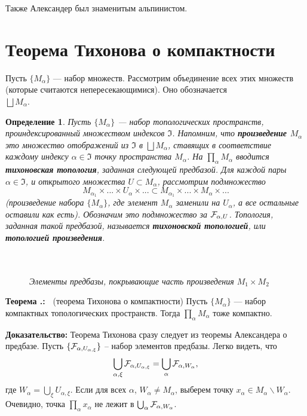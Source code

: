 \documentclass[12pt]{book}
\theoremstyle{upshape}
\theoremstyle{generic}
\newtheorem{opredelenie}[teorema]{Определение}
\def\еза{\end{remark}}
\theoremstyle{upshapenonumber}
\newcommand{\следствие}{%
     \refstepcounter{teorema}
     {\noindent\bf Следствие \thechapter.\arabic{teorema}:\ }}
\newcommand{\пример}{%
     \refstepcounter{teorema}
     {\noindent\bf Пример \thechapter.\arabic{teorema}:\ }}
\newcommand{\лемма}{%
     \refstepcounter{teorema}
     {\noindent\bf Лемма \thechapter.\arabic{teorema}:\ }}
\newcommand{\теорема}{%
     \refstepcounter{teorema}
     {\noindent\bf Теорема \thechapter.\arabic{teorema}:\ }}
\newcommand{\утверждение}{%
     \refstepcounter{teorema}
     {\noindent\bf Утверждение \thechapter.\arabic{teorema}:\ }}
\def\ноиндент{\noindent}
\def\бф{\bf}
\def\ем{\em}
\def\ез{\end{zadacha}}
\def\еу{\end{ukazanie}}
\def\определение{\begin{opredelenie}}
\def\ео{\end{opredelenie}}
\def\goth{\mathfrak}
\def\енум{\begin{enumerate}}
\def\ее{\end{enumerate}}
\begin{document}
Также Александер был знаменитым альпинистом.


\section{Теорема Тихонова о компактности}


Пусть $\{M_\alpha\}$ --- набор множеств.
Рассмотрим объединение всех этих множеств
(которые считаются непересекающимися).
Оно обозначается \\ $\bigsqcup M_\alpha$.


\определение
Пусть $\{M_\alpha\}$ --- набор топологических пространств, 
проиндексированный множеством индексов ${\goth I}$. 
Напомним, что {\бф произведение $M_\alpha$} 
это множество отображений из ${\goth I}$ в $\bigsqcup
M_\alpha$, ставящих в соответствие каждому индексу
$\alpha \in {\goth I}$ точку пространства $M_\alpha$.
На $\prod_\alpha M_\alpha$ вводится {\бф тихоновская топология},
заданная следующей предбазой. Для каждой пары
$\alpha \in {\goth I}$, и открытого множества
$U \subset M_\alpha$, рассмотрим
подмножество 
\[
M_{\alpha_1} \times ... \times U_\alpha \times ... \subset 
M_{\alpha_1} \times ... \times M_\alpha \times ...
\]
(произведение набора $\{M_\alpha\}$, где
элемент $M_\alpha$ заменили на $U_\alpha$,
а все остальные оставили как есть).
Обозначим это подмножество за ${\cal F}_{\alpha, U}$.
Топология, заданная такой предбазой,
называется {\бф тихоновской топологией},
или {\бф топологией произведения}.
\ео


\begin{figure}[ht]
\begin{center}\ \\
\\
{\small \em Элементы предбазы, покрывающие часть
произведения $M_1\times M_2$}
\end{center}
\end{figure}

\теорема 
(теорема Тихонова о компактности)
Пусть $\{M_\alpha\}$ --- набор компактных 
топологических пространств. Тогда $\prod_\alpha M_\alpha$
тоже компактно.


\ноиндент
{\бф Доказательство:}
Теорема Тихонова сразу следует из теоремы Александера о
предбазе. Пусть $\{ {\cal F}_{\alpha, U_{\alpha, \xi}}\}$ --
набор элементов предбазы. Легко видеть, что
\[
\bigcup_{\alpha, \xi} {\cal F}_{\alpha, U_{\alpha, \xi}} =
\bigcup_\alpha  {\cal F}_{\alpha, W_\alpha},
\]
где $W_\alpha= \bigcup_\xi U_{\alpha, \xi}$.
Если для всех $\alpha$, $W_\alpha \neq M_\alpha$,
выберем точку $x_\alpha \in M_\alpha\backslash W_\alpha$.
Очевидно, точка $\prod_\alpha x_\alpha$ не лежит в 
$\bigcup_\alpha  {\cal F}_{\alpha, W_\alpha}$.
\end{document}
